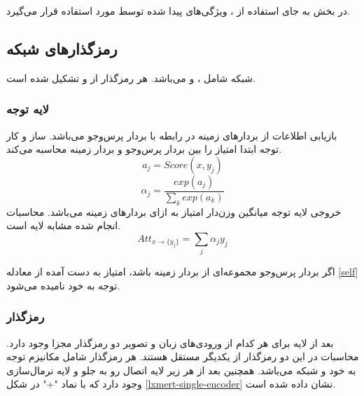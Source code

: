 در بخش 
به جای استفاده از
، ویژگی‌های پیدا شده توسط 
\cite{ren15fasterrcnn}
مورد استفاده قرار می‌گیرد.

\subsection{رمزگذارهای شبکه}
شبکه
شامل
،
و
می‌باشد. هر رمزگذار از 
و 
تشکیل شده است.

\subsubsection{لایه توجه}

بازیابی اطلاعات از بردارهای زمینه
در رابطه با بردار پرس‌وجو
می‌باشد. ساز و کار توجه ابتدا امتیاز 
را بین بردار پرس‌وجو 
و بردار زمینه
محاسبه می‌کند.
\begin{equation}
	a_j = Score(x, y_j)
\end{equation}
\begin{equation}
	\alpha_j = \frac{exp(a_j)}{\sum_{k} exp(a_k)}
\end{equation}
خروجی لایه توجه میانگین وزن‌دار امتیاز 
به ازای بردار‌های زمینه می‌باشد. محاسبات انجام شده مشابه لایه 
است.
\begin{equation}\label{self}
	Att_{x \to \{y_j\}} = \sum_{j} \alpha_jy_j
\end{equation}


اگر بردار پرس‌وجو
مجموعه‌ای از بردار زمینه
باشد، امتیاز به دست آمده از معادله
\ref{self}
توجه به خود
نامیده می‌شود.
\newpage
\subsubsection{رمزگذار
	}
بعد از لایه 
برای هر کدام از ورودی‌های زبان و تصویر دو رمزگذار
مجزا وجود دارد. محاسبات در این دو رمزگذار از یکدیگر مستقل هستند. هر رمزگذار شامل مکانیزم توجه به خود
و شبکه 
می‌باشد. همچنین بعد از هر زیر لایه اتصال رو به جلو
و لایه نرمال‌سازی
 وجود دارد که با نماد "+" در شکل
\ref{lxmert-single-encoder}
 نشان داده شده است.

